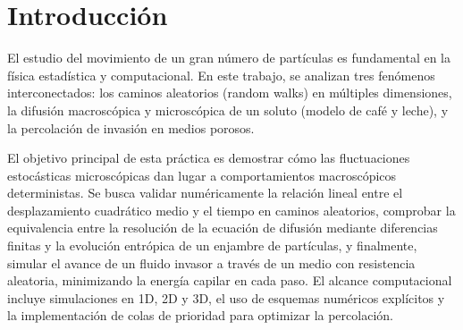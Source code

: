 \section{Introducción}

El estudio del movimiento de un gran número de partículas es fundamental en la física estadística y computacional. En este trabajo, se analizan tres fenómenos interconectados: los caminos aleatorios (random walks) en múltiples dimensiones, la difusión macroscópica y microscópica de un soluto (modelo de café y leche), y la percolación de invasión en medios porosos. 

El objetivo principal de esta práctica es demostrar cómo las fluctuaciones estocásticas microscópicas dan lugar a comportamientos macroscópicos deterministas. Se busca validar numéricamente la relación lineal entre el desplazamiento cuadrático medio y el tiempo en caminos aleatorios, comprobar la equivalencia entre la resolución de la ecuación de difusión mediante diferencias finitas y la evolución entrópica de un enjambre de partículas, y finalmente, simular el avance de un fluido invasor a través de un medio con resistencia aleatoria, minimizando la energía capilar en cada paso. El alcance computacional incluye simulaciones en 1D, 2D y 3D, el uso de esquemas numéricos explícitos y la implementación de colas de prioridad para optimizar la percolación.
